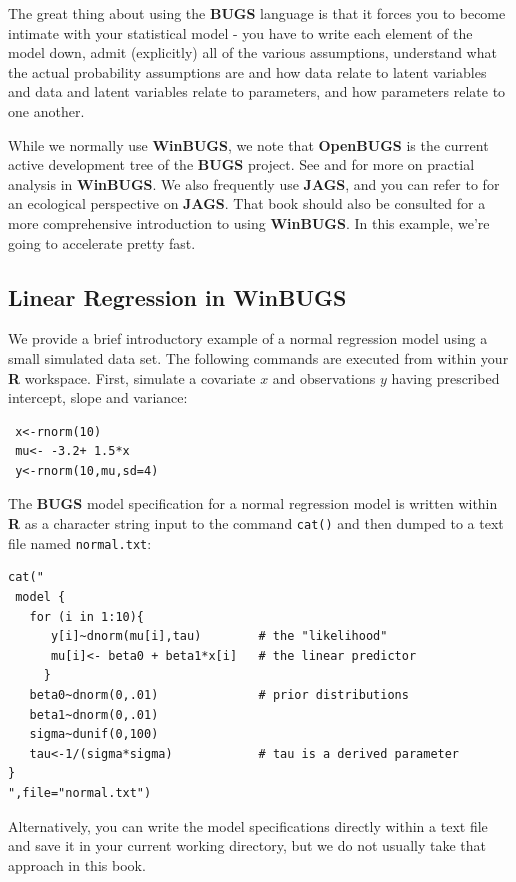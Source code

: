 The great thing about using the {\bf BUGS} language is that it forces
you to become intimate with your statistical model - you have to write
each element of the model down, admit (explicitly) all of the various
assumptions, understand what the actual probability assumptions are
and how data relate to latent variables and data and latent variables
relate to parameters, and how parameters relate to one another.

While we normally use
{\bf WinBUGS}, we note that {\bf
 OpenBUGS} is the current active development tree of the {\bf BUGS}
project. See \citet[][ch.xyz]{kery:2010} and
\citet[][appendix xyz]{kery_schaub:2011} for more on practial analysis
in {\bf WinBUGS}. We also frequently use {\bf JAGS}, and you can refer to \citet{hobbs:2011} for an ecological
perspective on {\bf JAGS}.
That book should also be consulted
for a more comprehensive introduction to using {\bf WinBUGS}. In this
example, we're going to accelerate pretty fast.

\subsection{Linear Regression in WinBUGS}

We provide a brief introductory example of a normal regression model
using a small simulated data set. The following commands are executed
from within your {\bf R} workspace.
First, simulate a covariate $x$ and observations $y$ having
prescribed intercept, slope and variance:
\begin{verbatim}
 x<-rnorm(10)
 mu<- -3.2+ 1.5*x
 y<-rnorm(10,mu,sd=4)
\end{verbatim}
The {\bf BUGS} model specification for a normal regression model is
written within {\bf R} as a character string input to the command
\mbox{\tt cat()} and
then dumped to a text file named \mbox{\tt normal.txt}:
\begin{verbatim}
cat("
 model {
   for (i in 1:10){
      y[i]~dnorm(mu[i],tau)        # the "likelihood"
      mu[i]<- beta0 + beta1*x[i]   # the linear predictor
     }
   beta0~dnorm(0,.01)              # prior distributions
   beta1~dnorm(0,.01)
   sigma~dunif(0,100)
   tau<-1/(sigma*sigma)            # tau is a derived parameter
}
",file="normal.txt")
\end{verbatim}
Alternatively, you
can write the model specifications directly within a text file and
save it in your current working directory, but we do not usually take
that approach in this book.

